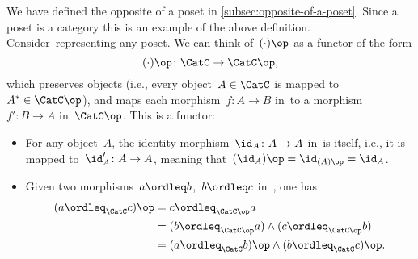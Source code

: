 \begin{example}
We have defined the opposite of a poset in \cref{subsec:opposite-of-a-poset}.
Since a poset is a category 
this is an example of the above definition. Consider~\CatC representing any poset. We can think of~$(\cdot)\op$ as a functor of the form
    \begin{equation}
        (\cdot)\op\colon \CatC \to \CatC\op,
    \end{equation}
    which preserves objects (i.e., every object~$A \in \CatC$ is mapped to~$A^*\in \CatC\op$), and maps each morphism~$f\colon A\to B$ in~\CatC to a morphism~$f'\colon B\to A$ in~$\CatC\op$. This is a functor:
    \begin{itemize}
        \item For any object~$A$, the identity morphism~$\id_A\colon A\to A$ in~\CatC is itself, i.e., it is mapped to~$\id_A'\colon A\to A$, meaning that~$(\id_A)\op=\id_{(A)\op}=\id_A$.
        \item Given two morphisms~$a\ordleq b$,~$b\ordleq c$ in~\CatC, one has
        \begin{equation}
            \begin{aligned}
                (a\ordleq_{\CatC} c)\op &=c\ordleq_{\CatC\op} a\\
                &=(b\ordleq_{\CatC\op} a)\wedge (c\ordleq_{\CatC\op}b)\\
                &=(a\ordleq_{\CatC} b)\op \wedge (b\ordleq_{\CatC} c)\op.
            \end{aligned}
        \end{equation}
    \end{itemize}
\end{example}








